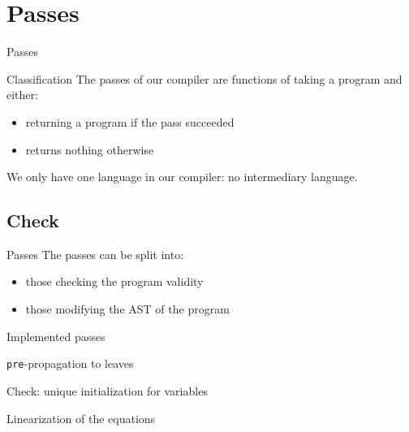 \documentclass{beamer}
\begin{document}
\section{Passes}
\begin{frame}{Passes}
	\begin{block}{Classification}
		The passes of our compiler are functions of taking a program and either:
		\begin{itemize}
			\item returning a program if the pass succeeded
			\item returns nothing otherwise
		\end{itemize}

		We only have one language in our compiler: no intermediary language.
	\end{block}
\end{frame}

\subsection{Check}
\begin{frame}
	\begin{block}{Passes}
		The passes can be split into:
		\begin{itemize}
			\item those checking the program validity
			\item those modifying the AST of the program
		\end{itemize}
	\end{block}
\end{frame}

\begin{frame}{Implemented passes}
	\begin{block}{\texttt{pre}-propagation to leaves}
	\end{block}
	\begin{block}{Check: unique initialization for variables}
	\end{block}
	\begin{block}{Linearization of the equations}
	\end{block}
\end{frame}
\end{document}
